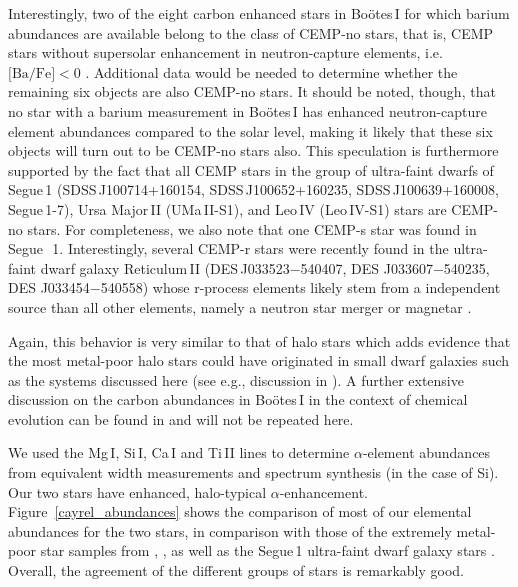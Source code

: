 \documentclass[]{emulateapj}
\begin{document}
Interestingly, two of the eight carbon enhanced stars in Bo\"otes\,I
for which barium abundances are available belong to the class of
CEMP-no stars, that is, CEMP stars without supersolar enhancement in
neutron-capture elements, i.e. $\mbox{[Ba/Fe]}<0$
\citep{araa}. Additional data would be needed to determine whether the
remaining six objects are also CEMP-no stars. It should be noted,
though, that no star with a barium measurement in Bo\"otes\,I has
enhanced neutron-capture element abundances compared to the solar
level, making it likely that these six objects will turn out to be
CEMP-no stars also. This speculation is furthermore supported by the
fact that all CEMP stars in the group of ultra-faint dwarfs of
Segue\,1 (SDSS\,J100714+160154, SDSS\,J100652+160235,
SDSS\,J100639+160008, Segue\,1-7), Ursa Major\,II (UMa\,II-S1), and
Leo\,IV (Leo\,IV-S1) stars are CEMP-no stars. For completeness, we
also note that one CEMP-s star was found in Segue~\,1. Interestingly,
several CEMP-r stars were recently found in the ultra-faint dwarf
galaxy Reticulum\,II (DES\,J033523−540407, DES J033607−540235, DES
J033454−540558) whose r-process elements likely stem from a
independent source than all other elements, namely a neutron star
merger or magnetar \citep{ji16b}.

Again, this behavior is very similar to that of halo stars which adds
evidence that the most metal-poor halo stars could have originated in
small dwarf galaxies such as the systems discussed here (see e.g.,
discussion in \citealt{fn15}). A further extensive discussion on the
carbon abundances in Bo\"otes\,I in the context of chemical evolution
can be found in \citet{gilmore13} and will not be repeated here.



We used the Mg\,I, Si\,I, Ca\,I and Ti\,II lines to
determine $\alpha$-element abundances from equivalent width
measurements and spectrum synthesis (in the case of Si). Our two stars
have enhanced, halo-typical $\alpha$-enhancement.
Figure~\ref{cayrel_abundances} shows the comparison of most of our
elemental abundances for the two stars, in comparison with those of
the extremely metal-poor star samples from \citet{cayrel2004},
\citet{yong13_II}, as well as the Segue\,1 ultra-faint dwarf galaxy
stars \citep{frebel14}. Overall, the agreement of the different groups
of stars is remarkably good.
\end{document}
